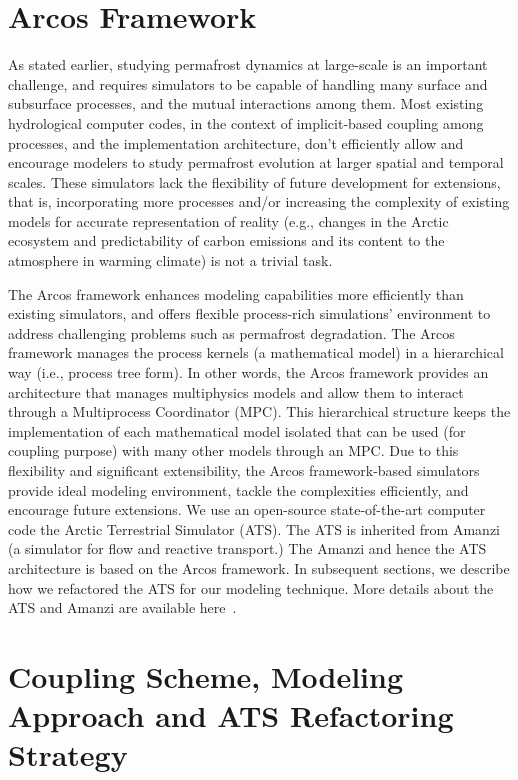 \documentclass[review]{elsarticle}
\begin{document}
\section{Arcos Framework}\label{arcos-framework}
As stated earlier, studying permafrost dynamics at large-scale is an important challenge, and requires simulators to be capable of handling many surface and subsurface processes, and the mutual interactions among them. Most existing hydrological computer codes, in the context of implicit-based coupling among processes, and the implementation architecture, don't efficiently allow and encourage modelers to study permafrost evolution at larger spatial and temporal scales. These simulators lack the flexibility of future development for extensions, that is, incorporating more processes and/or increasing the complexity of existing models for accurate representation of reality (e.g., changes in the Arctic ecosystem and predictability of carbon emissions and its content to the atmosphere in warming climate) is not a trivial task.

The Arcos framework enhances modeling capabilities more efficiently than existing simulators, and offers flexible process-rich simulations' environment to address challenging problems such as permafrost degradation. The Arcos framework manages the process kernels (a mathematical model) in a hierarchical way (i.e., process tree form). In other words, the Arcos framework provides an architecture that manages multiphysics models and allow them to interact through a Multiprocess Coordinator (MPC). This hierarchical structure keeps the implementation of each mathematical model isolated that can be used (for coupling purpose) with many other models through an MPC. Due to this flexibility and significant extensibility, the Arcos framework-based simulators provide ideal modeling environment, tackle the complexities efficiently, and encourage future extensions. 
We use an open-source state-of-the-art computer code the Arctic Terrestrial Simulator (ATS). The ATS is inherited from Amanzi (a simulator for flow and reactive transport.) The Amanzi and hence the ATS architecture is based on the Arcos framework. In subsequent sections, we describe how we refactored the ATS for our modeling technique. More details about the ATS and Amanzi are available here~\cite{ecoon2016managing, moulton2012high, spainter2016integrated}.


\section{Coupling Scheme, Modeling Approach and ATS Refactoring Strategy}\label{mixed-dim-model}
\end{document}
